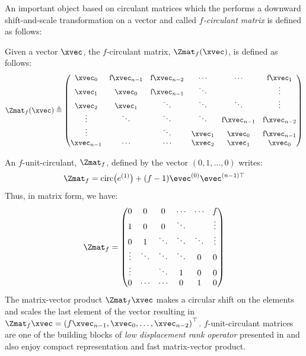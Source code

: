 \endgroup




An important object based on circulant matrices which the performs a downward shift-and-scale transformation on a vector and called \emph{$f$-circulant matrix} is defined as follows:
\begin{definition} \label{definition:ch2-f_circulant_matrix}
  Given a vector $\xvec$, the $f$-circulant matrix, $\Zmat_f(\xvec)$, is defined as follows:
  \begin{equation}
    \Zmat_f(\xvec) \triangleq
    \leftmatrix
      \xvec_0 & $f$ \xvec_{n-1} & $f$ \xvec_{n-2} & \cdots & \cdots & $f$ \xvec_{1} \\
      \xvec_{1} & \xvec_0 & $f$ \xvec_{n-1} & \ddots & & \vdots \\
      \xvec_{2} & \xvec_{1} & \ddots & \ddots & \ddots & \vdots \\ 
      \vdots & \ddots & \ddots & \ddots & $f$ \xvec_{n-1} & $f$ \xvec_{n-2} \\
      \vdots & & \ddots & \xvec_{1} & \xvec_{0} & $f$ \xvec_{n-1} \\
      \xvec_{n-1} & \cdots & \cdots & \xvec_{2} & \xvec_{1} & \xvec_0
    \rightmatrix
  \end{equation}
  \removespace
\end{definition}
\noindent
An $f$-unit-circulant, $\Zmat_f$, defined by the vector $\left(0, 1, \dots, 0 \right)$ writes:
\begin{equation}
  \Zmat_f = \circulant \big(e^{(1)} \big) + (f - 1) \evec^{(0)} \evec^{(n-1)\top}
\end{equation}
\noindent
Thus, in matrix form, we have:
\begin{equation}
  \Zmat_f = 
    \leftmatrix
      0      & 0      & 0      & \cdots & \cdots & f      \\
      1      & 0      & 0      & \ddots &        & \vdots \\
      0      & 1      & \ddots & \ddots & \ddots & \vdots \\ 
      \vdots & \ddots & \ddots & \ddots & 0      & 0      \\
      \vdots &        & \ddots & 1      & 0      & 0      \\
      0      & \cdots & \cdots & 0      & 1      & 0
    \rightmatrix
\end{equation}
\noindent
The matrix-vector product $\Zmat_f \xvec$ makes a circular shift on the elements and scales the last element of the vector resulting in $\Zmat_f \xvec = \leftmat f \xvec_{n-1}, \xvec_0, \dots, \xvec_{n-2} \rightmat^\top$.
$f$-unit-circulant matrices are one of the building blocks of \emph{low displacement rank operator} presented in  and also enjoy compact representation and fast matrix-vector product.



